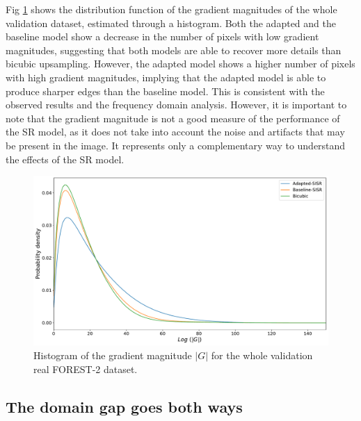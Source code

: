         Fig \ref{fig:5-gradient-histogram-validation-dataset} shows the distribution function of the gradient magnitudes of the whole validation dataset, estimated through a histogram.
        Both the adapted and the baseline model show a decrease in the number of pixels with low gradient magnitudes, suggesting that both models are able to recover more details than bicubic upsampling.
        However, the adapted model shows a higher number of pixels with high gradient magnitudes, implying that the adapted model is able to produce sharper edges than the baseline model.
        This is consistent with the observed results and the frequency domain analysis. 
        However, it is important to note that the gradient magnitude is not a good measure of the performance of the SR model, as it does not take into account the noise and artifacts that may be present in the image.
        It represents only a complementary way to understand the effects of the SR model.


        \begin{figure}[H]
            \centering
            \includegraphics[scale=0.4]{Includes/5-gradient-histogram-validation-dataset.pdf}
            \caption{Histogram of the gradient magnitude $|G|$ for the whole validation real FOREST-2 dataset.}
            \label{fig:5-gradient-histogram-validation-dataset}
        \end{figure}

    \subsection{The domain gap goes both ways}


